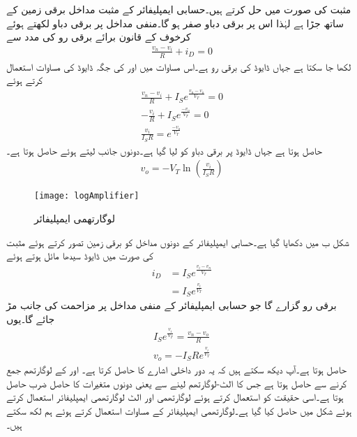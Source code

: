 مثبت  کی صورت میں حل کرتے ہیں۔حسابی ایمپلیفائر کے مثبت مداخل برقی زمین کے ساتھ جڑا ہے لہٰذا اس پر برقی دباو  صفر ہو گا۔منفی مداخل پر برقی دباو  لکھتے ہوئے کرخوف کے قانون برائے برقی رو کی مدد سے
\begin{align*}
\frac{v_n-v_i}{R}+i_D=0
\end{align*}
لکھا جا سکتا ہے جہاں  ڈایوڈ  کی برقی رو ہے۔اس مساوات میں   اور  کی جگہ ڈایوڈ کی مساوات استعمال کرتے ہوئے 
\begin{align*}
\frac{v_n-v_i}{R}+I_S e^{\frac{v_n-v_o}{V_T}}=0\\
-\frac{v_i}{R}+I_S e^{\frac{-v_o}{V_T}}=0\\
\frac{v_i}{I_S R}= e^{\frac{-v_o}{V_T}}
\end{align*}
حاصل ہوتا ہے جہاں ڈایوڈ پر برقی دباو کو  لیا گیا ہے۔دونوں جانب  لیتے ہوئے حاصل ہوتا ہے۔
\begin{align*}
v_o=-V_T \ln {\left( \frac{v_i}{I_S R} \right)}
\end{align*}
%
\begin{figure}
\centering
\texttt{[image: logAmplifier]}
\caption{لوگارتھمی ایمپلیفائر}
\label{شکل_ڈایوڈ_لوگارتھم_ایمپلیفائر}
\end{figure}

شکل  ب میں   دکھایا گیا ہے۔حسابی ایمپلیفائر کے دونوں مداخل کو برقی زمین تصور کرتے ہوئے مثبت  کی صورت میں ڈایوڈ  سیدھا مائل ہوتے ہوئے
\begin{align*}
i_D&=I_S e^{\frac{v_i-v_n}{V_T}}\\
&=I_S e^{\frac{v_i}{V_T}}
\end{align*}
برقی رو گزارے گا جو حسابی ایمپلیفائر کے منفی مداخل پر مزاحمت کی جانب مڑ جائے گا۔یوں
\begin{align*}
I_S e^{\frac{v_i}{V_T}}=\frac{v_n-v_o}{R}\\
v_o=-I_S R e^{\frac{v_i}{V_T}}
\end{align*}
حاصل ہوتا ہے۔آپ دیکھ سکتے ہیں کہ یہ دور داخلی اشارے کا  حاصل کرتا ہے۔
 اور  کے لوگارتھم جمع کرنے سے  حاصل ہوتا ہے جس کا الٹ-لوگارتھم لینے سے  یعنی دونوں متغیرات کا حاصل ضرب حاصل ہوتا ہے۔اسی حقیقت کو استعمال کرتے ہوئے لوگارتھمی اور الٹ لوگارتھمی ایمپلیفائر استعمال کرتے  ہوئے شکل  میں  حاصل کیا گیا ہے۔لوگارتھمی ایمپلیفائر کے مساوات استعمال کرتے ہوئے ہم لکھ سکتے ہیں۔

